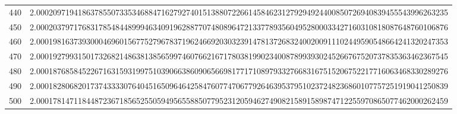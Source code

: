 \documentclass[final]{article}
\begin{document}
\begin{table}
\begin{center}
\begin{tabular}{|c|c|}
			440  &  2.000209719418637855073353468847162792740151388072266145846231279294924400850726940839455543996263235 \\
			450  &  2.000203797176831785484489994634091962887707480896472133778935604952800033427160310818087648760106876 \\
			460  &  2.000198163739300046960156775279678371962466920303239147813726832400200911102449590548664241320247353 \\
			470  &  2.000192799315017326821486381385659974607662167178038199023400878993930245266767520737835363462367545 \\
			480  &  2.000187685845226716315931997510390663860906566981771710897933276683167515206752217716063468330289276 \\
			490  &  2.000182806820173743333076404516509646425847607747067792646395379510237248236860107757251919041250839 \\
			500  &  2.000178147118448723671856525505949565588507795231205946274908215891589874712255970865077462000262459 \\
			\hline
			\hline
		\end{tabular}
	\end{center}
	\bigskip\bigskip
\end{table}
\end{document}
